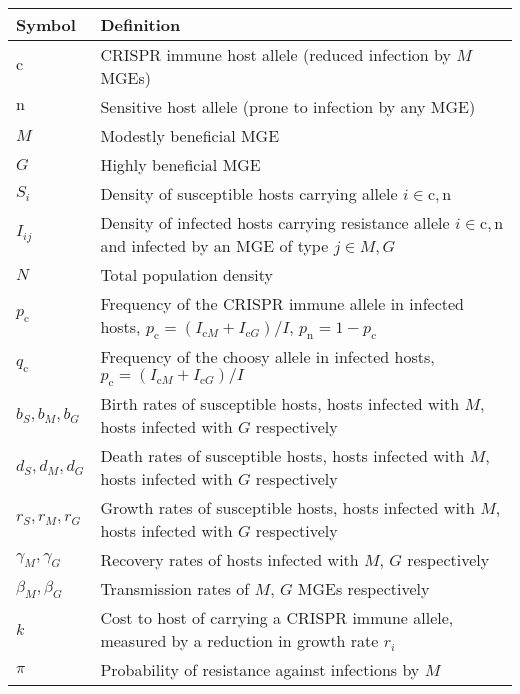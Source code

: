 \documentclass{article}
\newcommand{\badFGE}{M}
\newcommand{\goodFGE}{G}
\newcommand{\sensitive}{\mathrm{n}}
\newcommand{\immune}{\mathrm{c}}
\begin{document}
\begin{table}
    \begin{center}
        \begin{tabular}{p{2cm}p{10cm}}
\hline 
Symbol & Definition\tabularnewline
\hline 
    $\immune$ & CRISPR immune host allele (reduced infection by $\badFGE$ MGEs) \tabularnewline
    $\sensitive$ & Sensitive host allele (prone to infection by any MGE) \tabularnewline
    $\badFGE$ & Modestly beneficial MGE \tabularnewline
    $\goodFGE$ & Highly beneficial MGE \tabularnewline
    $S_{i}$ & Density of susceptible hosts carrying allele $i \in {\immune,\sensitive}$ \tabularnewline
    $I_{ij}$ & Density of infected hosts carrying resistance allele $i \in {\immune,\sensitive}$ and infected by an MGE of type $j \in {\badFGE,\goodFGE}$  \tabularnewline 
    $N$ & Total population density \tabularnewline 
            $p_{\immune}$ & Frequency of the CRISPR immune allele in infected hosts, $p_{\immune} = (I_{\immune \badFGE} + I_{\immune \goodFGE})/I$, $p_{\sensitive} = 1-p_{\immune}$ \tabularnewline
            $q_{\immune}$ & Frequency of the choosy allele in infected hosts, $p_{\immune} = (I_{\immune \badFGE} + I_{\immune \goodFGE})/I$ \tabularnewline
            $b_{S}, b_{\badFGE}, b_{\goodFGE}$ & Birth rates of susceptible hosts, hosts infected with $\badFGE$, hosts infected with $\goodFGE$ respectively \tabularnewline
            $d_{S}, d_{\badFGE}, d_{\goodFGE}$ & Death rates of susceptible hosts, hosts infected with $\badFGE$, hosts infected with $\goodFGE$ respectively \tabularnewline
            $r_{S}, r_{\badFGE}, r_{\goodFGE}$ & Growth rates of susceptible hosts, hosts infected with $\badFGE$, hosts infected with $\goodFGE$ respectively \tabularnewline 
            $\gamma_{\badFGE}, \gamma_{\goodFGE}$ & Recovery rates of hosts infected with $\badFGE$, $\goodFGE$ respectively \tabularnewline
            $\beta_{\badFGE}, \beta_{\goodFGE}$ & Transmission rates of $\badFGE$, $\goodFGE$ MGEs respectively \tabularnewline
            $k$ & Cost to host of carrying a CRISPR immune allele, measured by a reduction in growth rate $r_{i}$ \tabularnewline
            $\pi$ & Probability of resistance against infections by $\badFGE$ \tabularnewline
            \hline 
\end{tabular}
\caption{\label{tab:notation}}
    \end{center}
\end{table}
\end{document}
